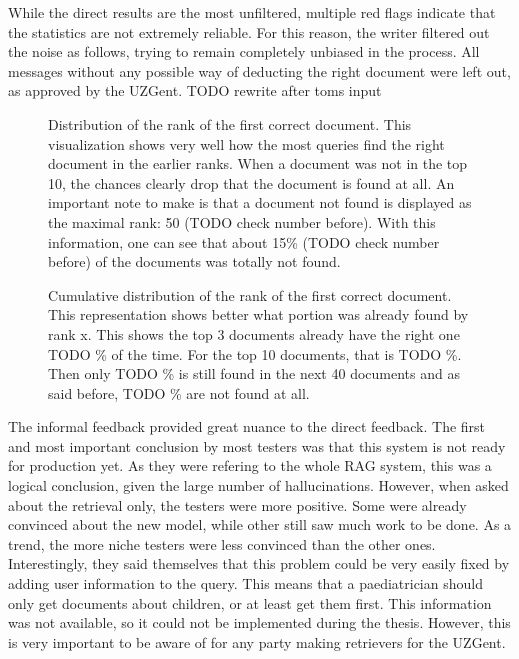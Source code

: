 While the direct results are the most unfiltered, multiple red flags indicate that the statistics are not extremely reliable. For this reason, the writer filtered out the noise as follows, trying to remain completely unbiased in the process. All messages without any possible way of deducting the right document were left out, as approved by the UZGent. TODO rewrite after toms input

\begin{figure}[H]
    \captionsetup{justification=centering}
    \caption{Distribution of the rank of the first correct document. This visualization shows very well how the most queries find the right document in the earlier ranks. When a document was not in the top 10, the chances clearly drop that the document is found at all. An important note to make is that a document not found is displayed as the maximal rank: 50 (TODO check number before). With this information, one can see that about 15\% (TODO check number before) of the documents was totally not found.}
    \label{fig:chunk_rank_density}
\end{figure}

\begin{figure}[H]
    \captionsetup{justification=centering}
    \caption{Cumulative distribution of the rank of the first correct document. This representation shows better what portion was already found by rank x. This shows the top 3 documents already have the right one TODO \% of the time. For the top 10 documents, that is TODO \%. Then only TODO \% is still found in the next 40 documents and as said before, TODO \% are not found at all.}
    \label{fig:chunk_rank_cumulative_distribution}
\end{figure}

The informal feedback provided great nuance to the direct feedback. The first and most important conclusion by most testers was that this system is not ready for production yet. As they were refering to the whole RAG system, this was a logical conclusion, given the large number of hallucinations. However, when asked about the retrieval only, the testers were more positive. Some were already convinced about the new model, while other still saw much work to be done. As a trend, the more niche testers were less convinced than the other ones. Interestingly, they said themselves that this problem could be very easily fixed by adding user information to the query. This means that a paediatrician should only get documents about children, or at least get them first. This information was not available, so it could not be implemented during the thesis. However, this is very important to be aware of for any party making retrievers for the UZGent.

